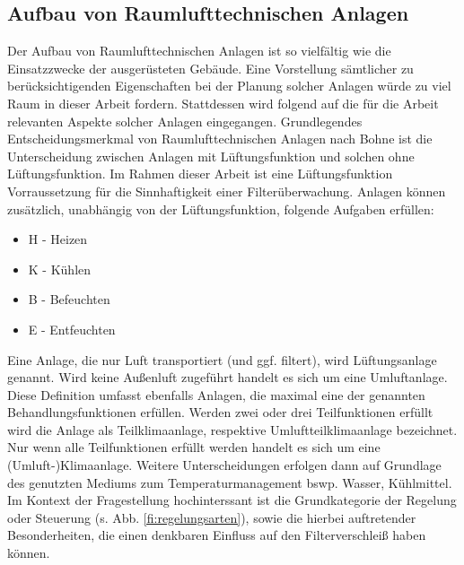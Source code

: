 \subsection{Aufbau von Raumlufttechnischen Anlagen}
\label{sec:aufbau}
Der Aufbau von Raumlufttechnischen Anlagen ist so vielfältig wie die Einsatzzwecke der ausgerüsteten Gebäude. Eine Vorstellung sämtlicher zu berücksichtigenden Eigenschaften bei der Planung solcher Anlagen würde zu viel Raum in dieser Arbeit fordern. Stattdessen wird folgend auf die für die Arbeit relevanten Aspekte solcher Anlagen eingegangen. \newline
Grundlegendes Entscheidungsmerkmal von Raumlufttechnischen Anlagen nach Bohne \cite{tavg} ist die Unterscheidung zwischen Anlagen mit Lüftungsfunktion und solchen ohne Lüftungsfunktion. Im Rahmen dieser Arbeit ist eine Lüftungsfunktion Vorraussetzung für die Sinnhaftigkeit einer Filterüberwachung.
Anlagen können zusätzlich, unabhängig von der Lüftungsfunktion, folgende Aufgaben erfüllen:
\begin{itemize}
    \item H - Heizen
    \item K - Kühlen
    \item B - Befeuchten
    \item E - Entfeuchten
\end{itemize}
Eine Anlage, die nur Luft transportiert (und ggf. filtert), wird Lüftungsanlage genannt. Wird keine Außenluft zugeführt handelt es sich um eine Umluftanlage. Diese Definition umfasst ebenfalls Anlagen, die maximal eine der genannten Behandlungsfunktionen erfüllen. Werden zwei oder drei Teilfunktionen erfüllt wird die Anlage als Teilklimaanlage, respektive Umluftteilklimaanlage bezeichnet.
Nur wenn alle Teilfunktionen erfüllt werden handelt es sich um eine (Umluft-)Klimaanlage. \newline
Weitere Unterscheidungen erfolgen dann auf Grundlage des genutzten Mediums zum Temperaturmanagement bswp. Wasser, Kühlmittel.\cite{tavg}
Im Kontext der Fragestellung hochinterssant ist die Grundkategorie der Regelung oder Steuerung (s. Abb. \ref{fi:regelungsarten}), sowie die hierbei auftretender Besonderheiten, die einen denkbaren Einfluss auf den Filterverschleiß haben können.
